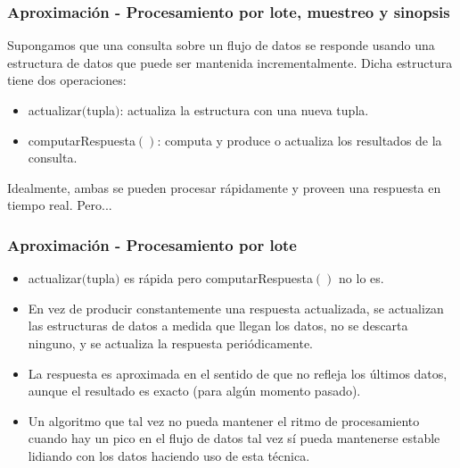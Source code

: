 \begin{frame}
\frametitle{Aproximación - Procesamiento por lote,  muestreo y sinopsis}
Supongamos que una consulta sobre un flujo de datos se responde usando una estructura de datos que puede ser mantenida incrementalmente. Dicha estructura tiene dos operaciones:
\begin{itemize}
\item actualizar$($tupla$)$: actualiza la estructura con una nueva tupla.
\item computarRespuesta$()$: computa y produce o actualiza los resultados de la consulta.
\end{itemize}
Idealmente, ambas se pueden procesar rápidamente y proveen una respuesta en tiempo real. Pero...
\end{frame}

\begin{frame}
\frametitle{Aproximación - Procesamiento por lote}
\begin{itemize}
\item actualizar$($tupla$)$ es rápida pero computarRespuesta$()$ no lo es.
\item En vez de producir constantemente una respuesta actualizada, se actualizan las estructuras de datos a medida que llegan los datos, no se descarta ninguno, y se actualiza la respuesta periódicamente.
\item La respuesta es aproximada en el sentido de que no refleja los últimos datos, aunque el resultado es exacto (para algún momento pasado). 
\item Un algoritmo que tal vez no pueda mantener el ritmo de procesamiento cuando hay un pico en el flujo de datos tal vez sí pueda mantenerse estable lidiando con los datos haciendo uso de esta técnica.
\end{itemize}
\end{frame}

